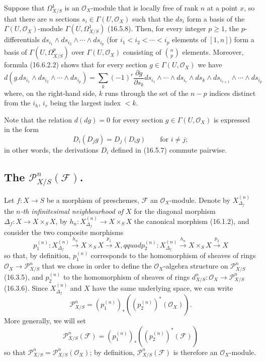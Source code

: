 \begin{env}[16.6.5]
\label{IV.16.6.5}
Suppose that $\Omega_{X/S}^1$ is an $\mathcal{O}_X$-module that is locally free
of rank $n$ at a point $x$, so that there are $n$ sections
$s_i\in\Gamma(U,\mathcal{O}_X)$ such that the $ds_i$ form a basis of the
$\Gamma(U,\mathcal{O}_X)$-module $\Gamma(U,\Omega_{X/S}^1)$ (16.5.8).
Then, for every integer $p\geq1$, the $p$-differentials
$ds_{i_1}\wedge ds_{i_2}\wedge\cdots\wedge ds_{i_p}$ (for
$i_1<i_2<\cdots<i_p$ elements of $[1,n]$) form a basis of
$\Gamma(U,\Omega_{X/S}^p)$ over $\Gamma(U,\mathcal{O}_X)$ consisting of
$\binom{n}{p}$ elements. Moreover, formula (16.6.2.2) shows that for
every section $g\in\Gamma(U,\mathcal{O}_X)$ we have
\[
  d(g.ds_{i_1}\wedge ds_{i_2}\wedge\cdots\wedge ds_{i_p})
  =\sum_k(-1)^r\frac{\partial g}{\partial s_k}
  ds_{i_1}\wedge\cdots\wedge ds_{i_r}\wedge ds_k\wedge
  ds_{i_{r+1}}\wedge\cdots\wedge ds_{i_p}
  \tag{16.6.5.1}
  \label{IV.16.6.5.1}
\]
where, on the right-hand side, $k$ runs through the set of the $n-p$ indices
distinct from the $i_h$, $i_r$ being the largest index $<k$.

Note that the relation $d(dg)=0$ for every section
$g\in\Gamma(U,\mathcal{O}_X)$ is expressed in the form
\[
  D_i(D_jg)=D_j(D_ig)\qquad\text{for $i\neq j$};
\]
in other words, the derivations $D_i$ defined in (16.5.7) commute
pairwise.
\end{env}


\subsection{\texorpdfstring{The $\mathscr{P}_{X/S}^n(\mathscr{F})$.}{The P\string_\string^n(F).}}

\begin{env}[16.7.1]
\label{IV.16.7.1}
Let $f:X\to S$ be a morphism of preschemes, $\mathscr{F}$ an
$\mathcal{O}_X$-module. Denote by $X_{\Delta_f}^{(n)}$ the \emph{$n$-th
infinitesimal neighbourhood of $X$} for the diagonal morphism
$\Delta_f:X\to X\times_S X$, by
$h_n:X_{\Delta_f}^{(n)}\to X\times_S X$ the canonical morphism (16.1.2), and
consider the two composite morphisms
\[
  p_1^{(n)}:X_{\Delta_f}^{(n)}\xrightarrow{h_n}X\times_S X
  \xrightarrow{p_1}X,qquad
  p_2^{(n)}:X_{\Delta_f}^{(n)}\xrightarrow{h_n}X\times_S X
  \xrightarrow{p_2}X
\]
so that, by definition, $p_1^{(n)}$ corresponds to the homomorphism of
sheaves of rings $\mathcal{O}_X\to\mathscr{P}_{X/S}^n$ that we chose in order
to define the $\mathcal{O}_X$-algebra structure on
$\mathscr{P}_{X/S}^n$ (16.3.5), and $p_2^{(n)}$ to the homomorphism of sheaves
of rings $d_{X/S}^n:\mathcal{O}_X\to\mathscr{P}_{X/S}^n$ (16.3.6). Since
$X_{\Delta_f}^{(n)}$ and $X$ have the same underlying space, we can write
\[
  \mathscr{P}_{X/S}^n
  =(p_1^{(n)})_*((p_2^{(n)})^*(\mathcal{O}_X)).
  \tag{16.7.1.1}
  \label{IV.16.7.1.1}
\]
More generally, we will set
\[
  \mathscr{P}_{X/S}^n(\mathscr{F})
  =(p_1^{(n)})_*((p_2^{(n)})^*(\mathscr{F}))
  \tag{16.7.1.2}
  \label{IV.16.7.1.2}
\]
so that
$\mathscr{P}_{X/S}^n=\mathscr{P}_{X/S}^n(\mathcal{O}_X)$; by definition,
$\mathscr{P}_{X/S}^n(\mathscr{F})$ is therefore an $\mathcal{O}_X$-module.
\end{env}

